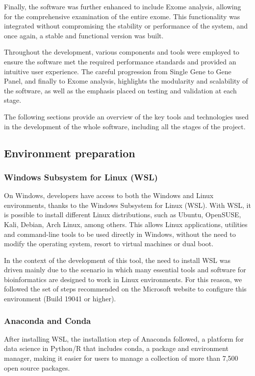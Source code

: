 Finally, the software was further enhanced to include Exome analysis, allowing for the comprehensive examination of the entire exome. This functionality was integrated without compromising the stability or performance of the system, and once again, a stable and functional version was built.

Throughout the development, various components and tools were employed to ensure the software met the required performance standards and provided an intuitive user experience. The careful progression from Single Gene to Gene Panel, and finally to Exome analysis, highlights the modularity and scalability of the software, as well as the emphasis placed on testing and validation at each stage.

The following sections provide an overview of the key tools and technologies used in the development of the whole software, including all the stages of the project.
\subsection{Environment preparation }
\subsubsection{\textbf{Windows Subsystem for Linux (WSL)}}

On Windows, developers have access to both the Windows and Linux environments, thanks to the Windows Subsystem for Linux (WSL). With WSL, it is possible to install different Linux distributions, such as Ubuntu, OpenSUSE, Kali, Debian, Arch Linux, among others. This allows Linux applications, utilities and command-line tools to be used directly in Windows, without the need to modify the operating system, resort to virtual machines or dual boot. \cite{wsl}

In the context of the development of this tool, the need to install WSL was driven mainly due to the scenario in which many essential tools and software for bioinformatics are designed to work in Linux environments. For this reason, we followed the set of steps recommended on the Microsoft website to configure this environment (Build 19041 or higher). \cite{wsl}

\subsubsection{\textbf{Anaconda and Conda}}

After installing WSL, the installation step of Anaconda followed, a platform for data science in Python/R that includes conda, a package and environment manager, making it easier for users to manage a collection of more than 7,500 open source packages. \cite{anaconda1}

